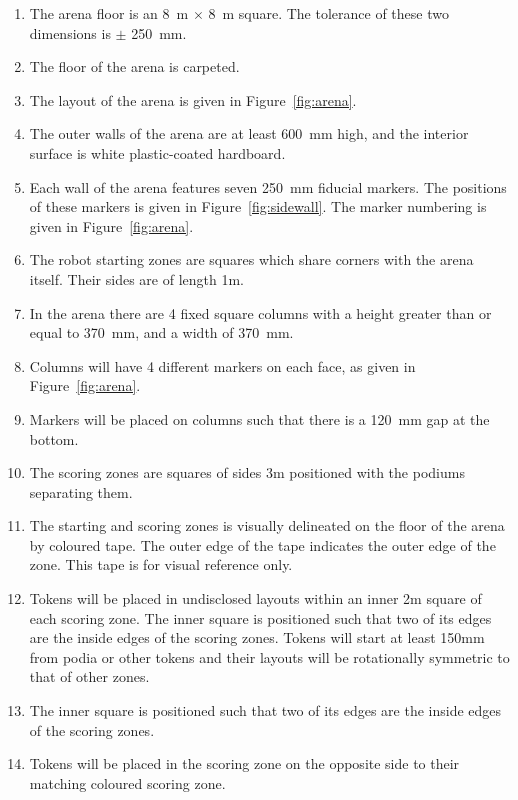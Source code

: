 \begin{enumerate}
  \item The arena floor is an \SI{8}{m} $\times$ \SI{8}{m} square. The tolerance
        of these two dimensions is $\pm$ \SI{250}{mm}.
  \item The floor of the arena is carpeted.
  \item The layout of the arena is given in Figure~\ref{fig:arena}.
  \item The outer walls of the arena are at least \SI{600}{mm} high, and the
        interior surface is white plastic-coated hardboard.
  \item Each wall of the arena features seven \SI{250}{mm} fiducial markers.
        The positions of these markers is given in Figure~\ref{fig:sidewall}.
        The marker numbering is given in Figure~\ref{fig:arena}.
  \item The robot starting zones are squares which share corners with the arena
        itself. Their sides are of length \si{1}{m}.
  \item In the arena there are 4 fixed square columns with a height greater than
        or equal to \SI{370}{mm}, and a width of \SI{370}{mm}.
  \item Columns will have 4 different markers on each face, as given in
        Figure~\ref{fig:arena}.
  \item Markers will be placed on columns such that there is a \SI{120}{mm} gap at the bottom.
  \item The scoring zones are squares of sides \si{3}{m} positioned with the
        podiums separating them.
  \item The starting and scoring zones is visually delineated on the floor of
        the arena by coloured tape. The outer edge of the tape indicates the
        outer edge of the zone. This tape is for visual reference only.
  \item \label{spec:tokenpos} Tokens will be placed in undisclosed layouts
        within an inner \si{2}{m} square of each scoring zone. The inner square
        is positioned such that two of its edges are the inside edges of the
        scoring zones. Tokens will start at least \si{150}{mm} from podia
        or other tokens and their layouts will be rotationally symmetric to
        that of other zones.
  \item The inner square is positioned such that two of its edges are the
        inside edges of the scoring zones.
  \item Tokens will be placed in the scoring zone on the opposite side to their
        matching coloured scoring zone.
\end{enumerate}

